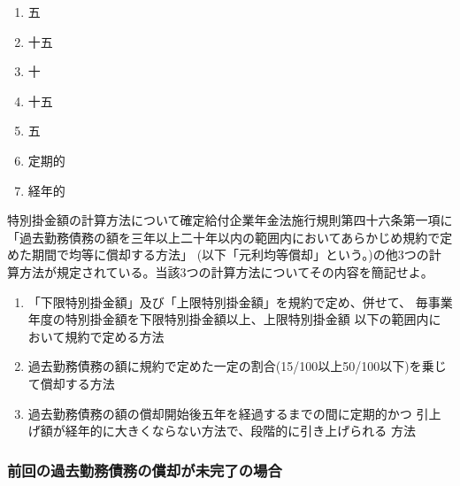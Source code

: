 \begin{answerbox}
  \begin{enumerate}[A: ]
    \item 五
    \item 十五
    \item 十
    \item 十五
    \item 五
    \item 定期的
    \item 経年的
  \end{enumerate}
\end{answerbox}

\begin{shortanswer}[数理人試験 H27 問題3 設問1]
  特別掛金額の計算方法について確定給付企業年金法施行規則第四十六条第一項に
  「過去勤務債務の額を三年以上二十年以内の範囲内においてあらかじめ規約で定めた期間で均等に償却する方法」
  (以下「元利均等償却」という。)の他3つの計算方法が規定されている。当該3つの計算方法についてその内容を簡記せよ。
\end{shortanswer}

\begin{answerbox}
  \begin{enumerate}[(1)]
    \item 「下限特別掛金額」及び「上限特別掛金額」を規約で定め、併せて、
毎事業年度の特別掛金額を下限特別掛金額以上、上限特別掛金額
以下の範囲内において規約で定める方法
    \item 過去勤務債務の額に規約で定めた一定の割合(15/100以上50/100以下)を乗じて償却する方法
    \item 過去勤務債務の額の償却開始後五年を経過するまでの間に定期的かつ
引上げ額が経年的に大きくならない方法で、段階的に引き上げられる
方法
  \end{enumerate}
\end{answerbox}

\newpage

\subsubsection{前回の過去勤務債務の償却が未完了の場合}

